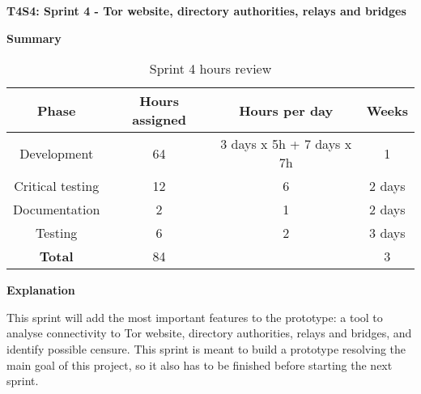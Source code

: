 \textbf{T4S4: Sprint 4 - Tor website, directory authorities, relays and bridges}

\textbf{Summary}
\begin{table}[!htb]
\centering
  \begin{tabular}{| c | c | c | c |}
  \hline Phase & Hours assigned & Hours per day & Weeks \\ \hline  
  Development & 64 & 3 days x 5h + 7 days x 7h & 1        \\ \hline
  Critical testing & 12 & 6 & 2 days       \\ \hline
  Documentation & 2 & 1 & 2 days        \\ \hline
  Testing & 6 & 2 & 3 days        \\ \hline \hline   
  \textbf{Total} & 84 &  & 3  \\ \hline
  \end{tabular}
  \caption{Sprint 4 hours review} \vspace{3pt}
  \label{tab:sprint4}
\end{table}

\textbf{Explanation}

This sprint will add the most important features to the prototype: a tool to analyse connectivity to Tor website, directory authorities, relays and bridges, and identify possible censure. This sprint is meant to build a prototype resolving the main goal of this project, so it also has to be finished before starting the next sprint.
